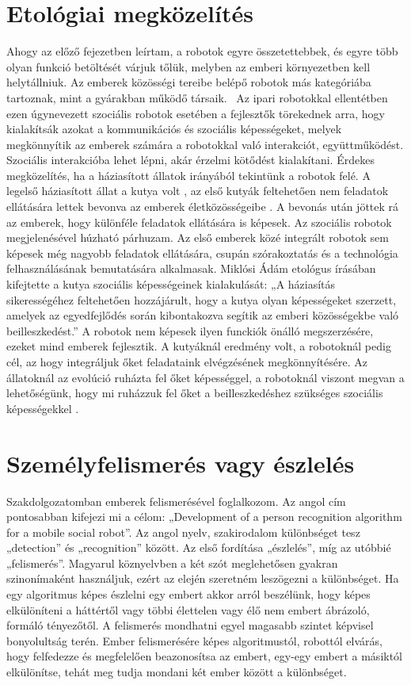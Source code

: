 \section{Etológiai megközelítés}
Ahogy az előző fejezetben leírtam, a robotok egyre összetettebbek, és egyre több olyan funkció betöltését várjuk tőlük, melyben az emberi környezetben kell helytállniuk. Az emberek közösségi tereibe belépő robotok más kategóriába tartoznak, mint a gyárakban működő társaik.  Az ipari robotokkal ellentétben ezen úgynevezett szociális robotok esetében a fejlesztők törekednek arra, hogy kialakítsák azokat a kommunikációs és szociális képességeket, melyek megkönnyítik az emberek számára a robotokkal való interakciót, együttműködést. Szociális interakcióba lehet lépni, akár érzelmi kötődést kialakítani. Érdekes megközelítés, ha a háziasított állatok irányából tekintünk a robotok felé. A legelső háziasított állat a kutya volt \cite{artc040}, az első kutyák feltehetően nem feladatok ellátására lettek bevonva az emberek életközösségeibe \cite{MIKLOSI2013287}. A bevonás után jöttek rá az emberek, hogy különféle feladatok ellátására is képesek. Az szociális robotok megjelenésével húzható párhuzam. Az első emberek közé integrált robotok sem képesek még nagyobb feladatok ellátására, csupán szórakoztatás és a technológia felhasználásának bemutatására alkalmasak. Miklósi Ádám etológus írásában kifejtette a kutya szociális képességeinek kialakulását: „A háziasítás sikerességéhez feltehetően hozzájárult, hogy a kutya olyan képességeket szerzett, amelyek az egyedfejlődés során kibontakozva segítik az emberi közösségekbe való beilleszkedést.” \cite{artc04} A robotok nem képesek ilyen funckiók önálló megszerzésére, ezeket mind emberek fejlesztik. A kutyáknál eredmény volt, a robotoknál pedig cél, az hogy integráljuk őket feladataink elvégzésének megkönnyítésére. Az állatoknál az evolúció ruházta fel őket képességgel, a robotoknál viszont megvan a lehetőségünk, hogy mi ruházzuk fel őket a beilleszkedéshez szükséges szociális képességekkel \cite{artc04}.

\section{Személyfelismerés vagy észlelés}
Szakdolgozatomban emberek felismerésével foglalkozom. Az angol cím pontosabban kifejezi mi a célom: „Development of a person recognition algorithm for a mobile social robot”.  Az angol nyelv, szakirodalom különbséget tesz „detection” és „recognition” között. Az első fordítása „észlelés”, míg az utóbbié „felismerés”. Magyarul köznyelvben a két szót meglehetősen gyakran szinonímaként használjuk, ezért az elején szeretném leszögezni a különbséget. Ha egy algoritmus képes észlelni egy embert akkor arról beszélünk, hogy képes elkülöníteni a háttértől vagy többi élettelen vagy élő nem embert ábrázoló, formáló tényezőtől. A felismerés mondhatni egyel magasabb szintet képvisel bonyolultság terén. Ember felismerésére képes algoritmustól, robottól elvárás, hogy felfedezze  és megfelelően beazonosítsa az embert, egy-egy embert a másiktól elkülönítse, tehát meg tudja mondani két ember között a különbséget.


